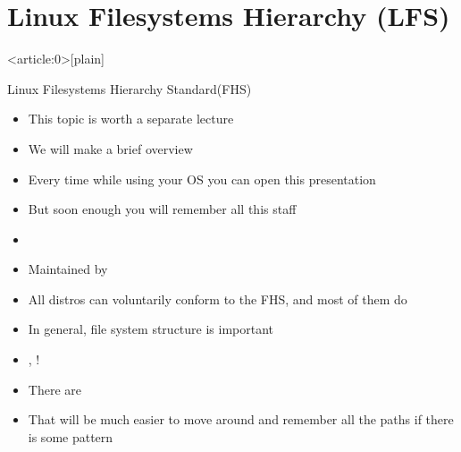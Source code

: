 \documentclass[usenames,dvipsnames,10pt,aspectratio=169]{beamer}
\begin{document}
\section{Linux Filesystems Hierarchy (LFS)}
{ %
    \begin{frame}<article:0>[plain]
     \end{frame}
}


\begin{frame}{Linux Filesystems Hierarchy Standard(FHS)}
    \begin{itemize}
        \item This topic is worth a separate lecture
        \item We will make a brief overview
        \item Every time while using your OS you can open this presentation
        \item But soon enough you will remember all this staff
        \item {}
        \item Maintained by
        \item All distros can voluntarily conform to the FHS, and most of them do
        \item In general, file system structure is important
        \item {}, !
        \item There are
        \item That will be much easier to move around and remember all the paths if there is some pattern
    \end{itemize}
\end{frame}
\end{document}
